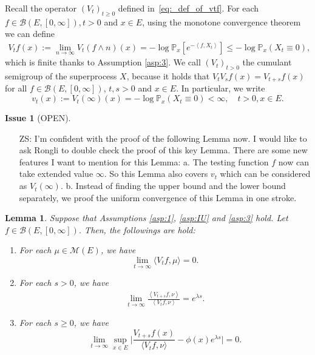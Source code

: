 \documentclass[12pt,a4paper]{amsart}
\numberwithin{equation}{section}
\theoremstyle{plain}
\newtheorem{lem}[thm]{Lemma}
\theoremstyle{definition}
\newtheorem{iss}{Issue}
\begin{document}
Recall the operator $(V_t)_{t\geq 0}$ defined in~\eqref{eq:_def_of_vtf}.
For each $f\in \mathcal B(E, [0,\infty]),t> 0$ and $x\in E$, using the monotone convergence theorem we can define
\begin{align}
\label{eq:Vtf_is_finite}
  V_tf(x)
  := \lim_{n\to \infty}V_t(f\wedge n)(x)
  = - \log \mathbb P_x[e^{-\left\langle f, X_t \right\rangle}] 
  \leq - \log \mathbb P_x(X_t \equiv 0),
\end{align}
which is finite thanks to Assumption \ref{asp:3}.
We call $(V_t)_{t> 0}$ the cumulant semigroup of the superprocess $X$, because it holds that $V_tV_sf(x) = V_{t+s}f(x)$ for all $f\in \mathcal B(E,[0,\infty])$, $t,s > 0$ and $x\in E$. 
In particular, we write
\[
	v_t(x):= V_t(\infty)(x)= -\log \mathbb P_x(X_t \equiv 0) < \infty,
  \quad t > 0, x\in E.
\]
\begin{iss}[OPEN]~
  \begin{itemize}
  \item[ZS:]
I'm confident with the proof of the following Lemma now. 
I would like to ask Rongli to double check the proof of this key Lemma.
There are some new features I want to mention for this Lemma:
a. The testing function $f$ now can take extended value $\infty$. So this Lemma also covers $v_t$ which can be considered as $V_t(\infty)$.
b. Instead of finding the upper bound and the lower bound separately, we proof the uniform convergence of this Lemma in one stroke.
  \end{itemize}
\end{iss}
\begin{lem}
\label{lem:asmptotic_of_Vtf}
  Suppose that Assumptions \ref{asp:1}, \ref{asp:IU} and \ref{asp:3} hold. 
  Let $f\in \mathcal B(E, [0,\infty])$.
  Then, the followings are hold:
  \begin{enumerate}
  \item \label{sublem:Vtf_vanish}
    For each $\mu \in \mathcal M(E)$, we have
    \[
      \lim_{t\rightarrow\infty}\langle V_tf,\mu\rangle=0.
    \]
   \item \label{lem:extinct_2_1}
For each $s>0$, we have
     \begin{align}
       \lim_{t\to \infty} \frac{\left\langle V_{t+s}f,\nu\right\rangle}{\left\langle V_t f,\nu\right\rangle} 
= e^{\lambda s}.
     \end{align}
  \item \label{lem:extinct:3}
    For each $s\geq 0$, we have
    \begin{equation} \label{eq:ont_point_ratio_limit}
      \lim_{t\to \infty} \sup_{x\in E}\Big|\frac{V_{t+s}f(x)}{\langle V_tf,\nu\rangle } - \phi(x)e^{\lambda s} \Big|
      =0.
    \end{equation}
  \end{enumerate}
\end{lem}
\end{document}
